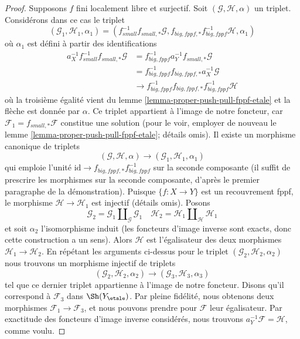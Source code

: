 \begin{proof}
\medskip\noindent
Supposons $f$ fini localement libre et surjectif.
Soit $(\mathcal{G}, \mathcal{H}, \alpha)$ un triplet.
Considérons dans ce cas le triplet
$$
(\mathcal{G}_1, \mathcal{H}_1, \alpha_1) =
(f_{small}^{-1}f_{small, *}\mathcal{G},
f_{big, fppf, *}f_{big, fppf}^{-1}\mathcal{H}, \alpha_1)
$$
où $\alpha_1$ est défini à partir des identifications
\begin{align*}
a_X^{-1}f_{small}^{-1}f_{small, *}\mathcal{G}
& =
f_{big, fppf}^{-1}a_Y^{-1}f_{small, *}\mathcal{G} \\
& =
f_{big, fppf}^{-1}f_{big, fppf, *}a_X^{-1}\mathcal{G} \\
& \to
f_{big, fppf}^{-1}f_{big, fppf, *}f_{big, fppf}^{-1}\mathcal{H}
\end{align*}
où la troisième égalité vient du lemme \ref{lemma-proper-push-pull-fppf-etale}
et la flèche est donnée par $\alpha$.
Ce triplet appartient à l'image de notre foncteur, car
$\mathcal{F}_1 = f_{small, *}\mathcal{F}$ constitue une solution
(pour le voir, employer de nouveau le lemme \ref{lemma-proper-push-pull-fppf-etale};
détails omis). Il existe un morphisme canonique de triplets
$$
(\mathcal{G}, \mathcal{H}, \alpha)
\to
(\mathcal{G}_1, \mathcal{H}_1, \alpha_1)
$$
qui emploie l'unité $\text{id} \to f_{big, fppf, *}f_{big, fppf}^{-1}$
sur la seconde composante (il suffit de prescrire les morphismes sur la
seconde composante, d'après le premier paragraphe de la démonstration). Puisque
$\{f : X \to Y\}$ est un recouvrement fppf, le morphisme
$\mathcal{H} \to \mathcal{H}_1$ est injectif (détails omis).
Posons
$$
\mathcal{G}_2 = \mathcal{G}_1 \amalg_\mathcal{G} \mathcal{G}_1\quad
\mathcal{H}_2 = \mathcal{H}_1 \amalg_\mathcal{H} \mathcal{H}_1
$$
et soit $\alpha_2$ l'isomorphisme induit (les foncteurs d'image inverse
sont exacts, donc cette construction a un sens). Alors $\mathcal{H}$ est
l'égalisateur des deux morphismes $\mathcal{H}_1 \to \mathcal{H}_2$.
En répétant les arguments ci-dessus pour le triplet
$(\mathcal{G}_2, \mathcal{H}_2, \alpha_2)$
nous trouvons un morphisme injectif de triplets
$$
(\mathcal{G}_2, \mathcal{H}_2, \alpha_2)
\to
(\mathcal{G}_3, \mathcal{H}_3, \alpha_3)
$$
tel que ce dernier triplet appartienne à l'image de notre foncteur.
Disons qu'il correspond à $\mathcal{F}_3$ dans $\Sh(Y_\etale)$.
Par pleine fidélité, nous obtenons deux morphismes
$\mathcal{F}_1 \to \mathcal{F}_3$, et nous pouvons prendre pour
$\mathcal{F}$ leur égalisateur.
Par exactitude des foncteurs d'image inverse considérés, nous
trouvons $a_Y^{-1}\mathcal{F} = \mathcal{H}$, comme voulu.
\end{proof}

